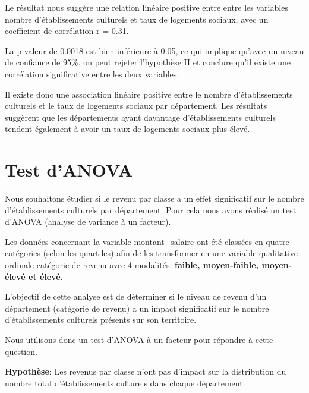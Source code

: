 \documentclass[mstat,12pt]{unswthesis}
\begin{document}
\medskip

Le résultat nous suggère une relation linéaire positive entre entre les
variables nombre d'établissements culturels et taux de logements
sociaux, avec un coefficient de corrélation r = 0.31.

\medskip

La p-valeur de 0.0018 est bien inférieure à 0.05, ce qui implique
qu'avec un niveau de confiance de 95\%, on peut rejeter l'hypothèse H et
conclure qu'il existe une corrélation significative entre les deux
variables.

\medskip

Il existe donc une association linéaire positive entre le nombre
d'établissements culturels et le taux de logements sociaux par
département. Les résultats suggèrent que les départements ayant
davantage d'établissements culturels tendent également à avoir un taux
de logements sociaux plus élevé.

\bigskip

\section{Test d'ANOVA}\label{test-danova}

Nous souhaitons étudier si le revenu par classe a un effet significatif
sur le nombre d'établissements culturels par département. Pour cela nous
avons réalisé un test d'ANOVA (analyse de variance à un facteur).

\medskip

Les données concernant la variable montant\_salaire ont été classées en
quatre catégories (selon les quartiles) afin de les transformer en une
variable qualitative ordinale catégorie de revenu avec 4 modalités:
\textbf{faible, moyen-faible, moyen-élevé et élevé}.

\medskip

L'objectif de cette analyse est de déterminer si le niveau de revenu
d'un département (catégorie de revenu) a un impact significatif sur le
nombre d'établissements culturels présents sur son territoire.

\medskip

Nous utilisons donc un test d'ANOVA à un facteur pour répondre à cette
question.

\medskip

\textbf{Hypothèse}: Les revenus par classe n'ont pas d'impact sur la
distribution du nombre total d'établissements culturels dans chaque
département.

\medskip
\end{document}
